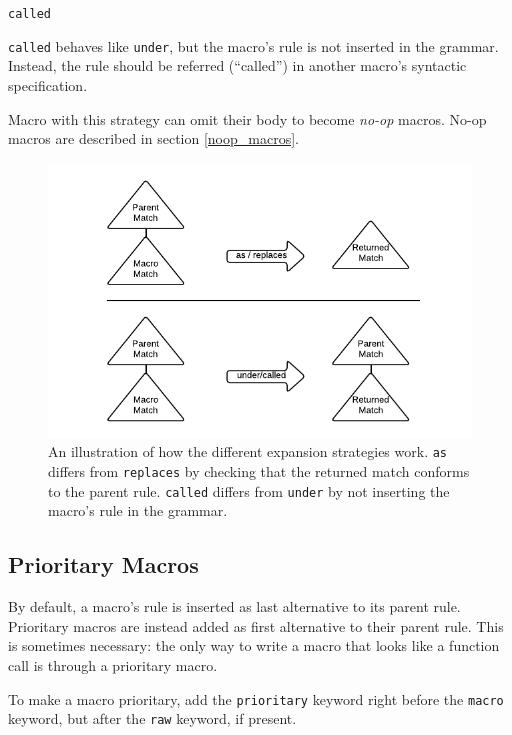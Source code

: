\begin{description}
\item \texttt{called}

  \texttt{called} behaves like \texttt{under}, but the macro's rule is not
  inserted in the grammar. Instead, the rule should be referred (``called'') in
  another macro's syntactic specification.

  Macro with this strategy can omit their body to become \emph{no-op}
  macros. No-op macros are described in section \ref{noop_macros}.

\end{description}

\begin{figure}[here]
\centerline{
  \includegraphics[width=1\textwidth]{img/strats.png}
}
\caption{An illustration of how the different expansion strategies
  work. \texttt{as} differs from \texttt{replaces} by checking that the returned
  match conforms to the parent rule. \texttt{called} differs from \texttt{under}
  by not inserting the macro's rule in the grammar.}
\label{img_strats}
\end{figure}

\subsection{Prioritary Macros}

By default, a macro's rule is inserted as last alternative to its parent
rule. Prioritary macros are instead added as first alternative to their parent
rule. This is sometimes necessary: the only way to write a macro that looks like
a function call is through a prioritary macro.

To make a macro prioritary, add the \texttt{prioritary} keyword right before the
\texttt{macro} keyword, but after the \texttt{raw} keyword, if present.

